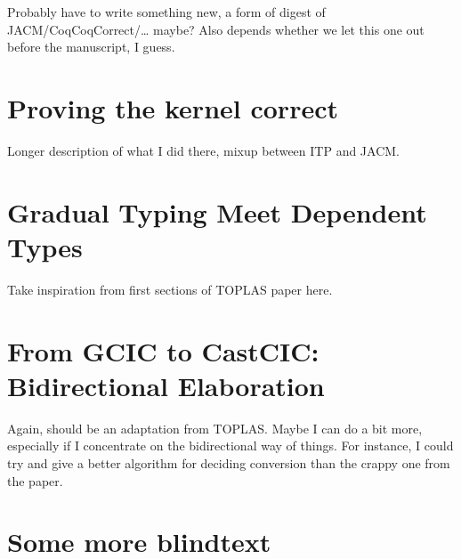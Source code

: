\documentclass[
  french,english,
	fontsize=10pt, %
	twoside=true, %
	secnumdepth=1, %
]{kaobook/kaobook}
\begin{document}
Probably have to write something new, a form of digest of JACM/CoqCoqCorrect/… maybe? Also depends whether we let this one out before the manuscript, I guess.

\chapter{Proving the kernel correct}
\label{chap:kernel-correctness}

Longer description of what I did there, mixup between ITP and JACM.

\label{part:gradual}

\chapter{Gradual Typing Meet Dependent Types}
\label{chap:gradual-dependent}

Take inspiration from first sections of TOPLAS paper here.

\chapter{From GCIC to CastCIC: Bidirectional Elaboration}
\label{chap:bidir-gradual-elab}

Again, should be an adaptation from TOPLAS. Maybe I can do a bit more, especially if
I concentrate on the bidirectional way of things. For instance, I could try and give a better algorithm for deciding conversion than the crappy one from the paper.

\appendix %


\chapter{Some more blindtext}

\blindtext


\backmatter %

\end{document}
